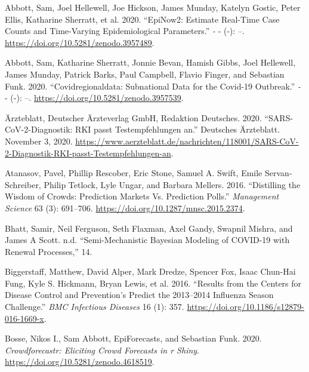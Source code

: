 \documentclass[
]{article}
\newlength{\cslhangindent}
\newlength{\cslentryspacingunit} %
\newenvironment{CSLReferences}[2] %
 {%
  \setlength{\parindent}{0pt}
  \ifodd #1
  \let\oldpar\par
  \def\par{\hangindent=\cslhangindent\oldpar}
  \fi
  \setlength{\parskip}{#2\cslentryspacingunit}
 }%
 {}
\begin{document}
\hypertarget{refs}{}
\begin{CSLReferences}{1}{0}
\leavevmode{}%
Abbott, Sam, Joel Hellewell, Joe Hickson, James Munday, Katelyn Gostic, Peter Ellis, Katharine Sherratt, et al. 2020. {``EpiNow2: Estimate Real-Time Case Counts and Time-Varying Epidemiological Parameters.''} \emph{-} - (-): --. \url{https://doi.org/10.5281/zenodo.3957489}.

\leavevmode{}%
Abbott, Sam, Katharine Sherratt, Jonnie Bevan, Hamish Gibbs, Joel Hellewell, James Munday, Patrick Barks, Paul Campbell, Flavio Finger, and Sebastian Funk. 2020. {``Covidregionaldata: Subnational Data for the Covid-19 Outbreak.''} \emph{-} - (-): --. \url{https://doi.org/10.5281/zenodo.3957539}.

\leavevmode{}%
Ärzteblatt, Deutscher Ärzteverlag GmbH, Redaktion Deutsches. 2020. {``SARS-CoV-2-Diagnostik: RKI passt Testempfehlungen an.''} {Deutsches Ärzteblatt}. November 3, 2020. \url{https://www.aerzteblatt.de/nachrichten/118001/SARS-CoV-2-Diagnostik-RKI-passt-Testempfehlungen-an}.

\leavevmode{}%
Atanasov, Pavel, Phillip Rescober, Eric Stone, Samuel A. Swift, Emile Servan-Schreiber, Philip Tetlock, Lyle Ungar, and Barbara Mellers. 2016. {``Distilling the {Wisdom} of {Crowds}: Prediction {Markets} Vs. {Prediction Polls}.''} \emph{Management Science} 63 (3): 691--706. \url{https://doi.org/10.1287/mnsc.2015.2374}.

\leavevmode{}%
Bhatt, Samir, Neil Ferguson, Seth Flaxman, Axel Gandy, Swapnil Mishra, and James A Scott. n.d. {``Semi-{Mechanistic Bayesian} Modeling of {COVID}-19 with {Renewal Processes},''} 14.

\leavevmode{}%
Biggerstaff, Matthew, David Alper, Mark Dredze, Spencer Fox, Isaac Chun-Hai Fung, Kyle S. Hickmann, Bryan Lewis, et al. 2016. {``Results from the Centers for Disease Control and Prevention's Predict the 2013--2014 {Influenza Season Challenge}.''} \emph{BMC Infectious Diseases} 16 (1): 357. \url{https://doi.org/10.1186/s12879-016-1669-x}.

\leavevmode{}%
Bosse, Nikos I., Sam Abbott, EpiForecasts, and Sebastian Funk. 2020. \emph{Crowdforecastr: Eliciting Crowd Forecasts in r Shiny}. \url{https://doi.org/10.5281/zenodo.4618519}.


\end{CSLReferences}
\end{document}
